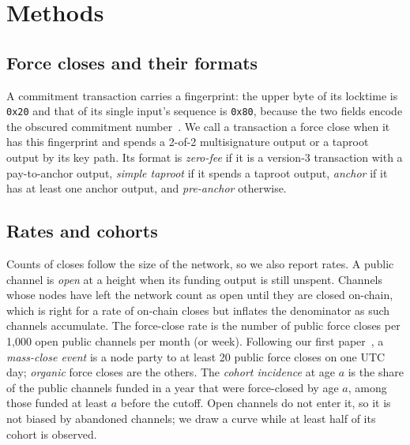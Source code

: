 \section{Methods}
\label{sec:methods}

\subsection{Force closes and their formats}
A commitment transaction carries a fingerprint: the upper byte of its locktime is \texttt{0x20} and that of its single
input's sequence is \texttt{0x80}, because the two fields encode the obscured commitment number~\cite{bolt3}. We call a
transaction a force close when it has this fingerprint and spends a 2-of-2 multisignature output or a taproot output by
its key path. Its format is \emph{zero-fee} if it is a version-3 transaction with a pay-to-anchor output,
\emph{simple taproot} if it spends a taproot output, \emph{anchor} if it has at least one anchor output, and
\emph{pre-anchor} otherwise.

\subsection{Rates and cohorts}
Counts of closes follow the size of the network, so we also report rates. A public channel is \emph{open} at a height
when its funding output is still unspent. Channels whose nodes have left the network count as open until they are
closed on-chain, which is right for a rate of on-chain closes but inflates the denominator as such channels
accumulate. The force-close rate is the number of public force closes per 1,000 open public channels per month (or
week). Following our first paper~\cite{kumar2026clientdiversity}, a \emph{mass-close event} is a node party to at least
20 public force closes on one UTC day; \emph{organic} force closes are the others. The \emph{cohort incidence} at age
$a$ is the share of the public channels funded in a year that were force-closed by age $a$, among those funded at
least $a$ before the cutoff. Open channels do not enter it, so it is not biased by abandoned channels; we draw a curve
while at least half of its cohort is observed.

